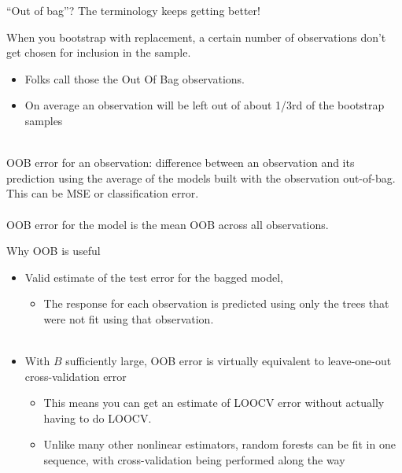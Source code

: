 \documentclass[mathserif, aspectratio=169]{beamer}
\begin{document}
\begin{frame}{``Out of bag''? The terminology keeps getting better!}

When you bootstrap with replacement, a certain number of observations don't get chosen for inclusion in the sample.  
\begin{itemize}
\item Folks call those the Out Of Bag observations.
\item On average an observation will be left out of about 1/3rd of the bootstrap samples\\~\\
\end{itemize}

\pause\pause
OOB error for an observation: difference between an observation and its prediction using the average of the models built with the observation out-of-bag.  This can be MSE or classification error.\\~\\

OOB error for the model is the mean OOB across all observations.  

\end{frame}

\begin{frame}{Why OOB is useful}

\begin{itemize}
\item Valid estimate of the test error for the bagged model, 
\begin{itemize}
\item The response for each observation is predicted using only the trees that were not fit using that observation. \\~\\
\end{itemize}
\item With $B$ sufficiently large, OOB error is virtually equivalent to leave-one-out cross-validation error
\begin{itemize}
\item This means you can get an estimate of LOOCV error without actually having to do LOOCV.
\item Unlike many other nonlinear estimators, random forests can be fit in one sequence, with cross-validation being performed along the way
\end{itemize}
\end{itemize}
\end{frame}
\end{document}
